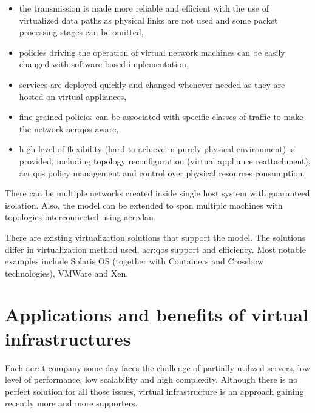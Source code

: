 \documentclass[11pt,openany]{book}
\begin{document}
        \begin{itemize}

          \item the transmission is made more reliable and efficient with the use of virtualized data paths as physical
                links are not used and some packet processing stages can be omitted,

          \item policies driving the operation of virtual network machines can be easily changed with software-based
                implementation,

          \item services are deployed quickly and changed whenever needed as they are hosted on virtual appliances,

          \item fine-grained policies can be associated with specific classes of traffic to make the network
                \gls{acr:qos}-aware,

          \item high level of flexibility (hard to achieve in purely-physical environment) is provided, including
                topology reconfiguration (virtual appliance reattachment), \gls{acr:qos} policy management and control
                over physical resources consumption.
        
        \end{itemize}

        There can be multiple networks created inside single host system with guaranteed isolation. Also, the model can
        be extended to span multiple machines with topologies interconnected using \gls{acr:vlan}.

        There are existing virtualization solutions that support the model. The solutions differ in virtualization
        method used, \gls{acr:qos} support and efficiency. Most notable examples include Solaris OS (together with
        Containers and Crossbow technologies), VMWare and Xen.


    \section{Applications and benefits of virtual infrastructures}
    \label{sec:ctx:infra}

      Each \gls{acr:it} company some day faces the challenge of partially utilized servers, low level of performance,
      low scalability and high complexity. Although there is no perfect solution for all those issues, virtual
      infrastructure is an approach gaining recently more and more supporters.  
\end{document}
